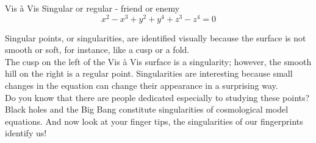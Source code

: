 \begin{surferPage}{Vis à Vis}
Singular or regular - friend or enemy\\
\smallskip
\[x^2	- x^3+ y^2+ y^4+ z^3- z^4	=  0\]

\vspace{0.3cm}
Singular points, or singularities, are identified visually because the surface is not smooth or soft, for instance, like a cusp or a fold.\\
\vspace{0.3cm}
The cusp on the left of the Vis \`a Vis surface is a singularity; however, the smooth hill on the right is a regular point. Singularities are interesting because small changes in the equation can change their appearance in a surprising way. \\

\vspace{0.3cm}
Do you know that there are people dedicated especially to studying these points? Black holes and the Big Bang constitute singularities of cosmological model equations. And now look at your finger tips, the singularities of our fingerprints identify us!
\end{surferPage}
